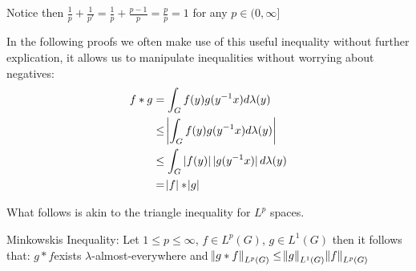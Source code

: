 \begin{remark}
Notice then $\frac{1}{p} + \frac{1}{p'} = \frac{1}{p} + \frac{p-1}{p} = \frac{p}{p} = 1$ for any $p \in (0,\infty]$
\end{remark}

\begin{remark}
In the following proofs we often make use of this useful inequality without further explication, it allows us to manipulate inequalities without worrying about negatives:
\begin{align*}
f \ast g &= \int_G f(y)g(y^{-1}x) d\lambda(y) \\
&\leq \abs{ \int_G f(y)g(y^{-1}x) d\lambda(y) } \\
&\leq \int_G \abs[0]{f(y)}\abs[0]{g(y^{-1}x)} d\lambda(y) \\
&= \abs{f} \ast \abs{g}
\end{align*}
\end{remark}

What follows is akin to the triangle inequality for $L^p$ spaces.

\begin{theorem}
Minkowskis Inequality: Let $1 \leq p \leq \infty$, $f \in L^p (G)$, $g \in L^1(G)$ then it follows that: 
$g \ast f $exists $\lambda$-almost-everywhere and
$ \norm{g \ast f}_{L^p(G)} \leq \norm{g}_{L^1(G)} \norm{f}_{L^p(G)} $
\end{theorem}

